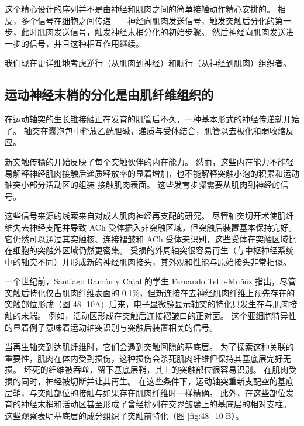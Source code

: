 这个精心设计的序列并不是由神经和肌肉之间的简单接触动作精心安排的。 相反，多个信号在细胞之间传递——神经向肌肉发送信号，触发突触后分化的第一步，此时肌肉发送信号，触发神经末梢分化的初始步骤。 然后神经向肌肉发送进一步的信号，并且这种相互作用继续。

我们现在更详细地考虑逆行（从肌肉到神经）和顺行（从神经到肌肉）组织者。

\subsection{运动神经末梢的分化是由肌纤维组织的}
在运动轴突的生长锥接触正在发育的肌管后不久，一种基本形式的神经传递就开始了。 轴突在囊泡包中释放乙酰胆碱，递质与受体结合，肌管以去极化和弱收缩反应。

新突触传输的开始反映了每个突触伙伴的内在能力。 然而，这些内在能力不能轻易解释神经肌肉接触后递质释放率的显着增加，也不能解释突触小泡的积累和运动轴突小部分活动区的组装 接触肌肉表面。 这些发育步骤需要从肌肉到神经的信号。

这些信号来源的线索来自对成人肌肉神经再支配的研究。 尽管轴突切开术使肌纤维失去神经支配并导致 ACh 受体插入非突触区域，但突触后装置基本保持完好。 它仍然可以通过其突触核、连接褶皱和 ACh 受体来识别，这些受体在突触区域比在细胞的突触外区域仍然更密集。 受损的外周轴突很容易再生（与中枢神经系统中的轴突不同）并形成新的神经肌肉接头，其外观和性能与原始接头非常相似。

一个世纪前，Santiago Ramón y Cajal 的学生 Fernando Tello-Muñóz 指出，尽管突触后特化仅占肌肉纤维表面的 0.1\%，但新连接在去神经肌肉纤维上预先存在的突触部位形成（图 48- 10A). 后来，电子显微镜显示轴突的特化只发生在与肌肉接触的末端。 例如，活动区形成在突触后连接褶皱口的正对面。 这个亚细胞特异性的显着例子意味着运动轴突识别与突触后装置相关的信号。

当再生轴突到达肌纤维时，它们会遇到突触间隙的基底层。 为了探索这种关联的重要性，肌肉在体内受到损伤，这种损伤会杀死肌肉纤维但保持其基底层完好无损。 坏死的纤维被吞噬，留下基底层鞘，其上的突触部位很容易识别。 在肌肉受损的同时，神经被切断并让其再生。 在这些条件下，运动轴突重新支配空的基底层鞘，与突触部位的接触与如果存在肌肉纤维时一样精确。 
此外，在这些部位发育的神经末梢和活动区甚至形成了曾经排列在交界皱襞上的基底层的相对支柱。 
这些观察表明基底层的成分组织了突触前特化（图 \ref{fig:48_10}B）。

